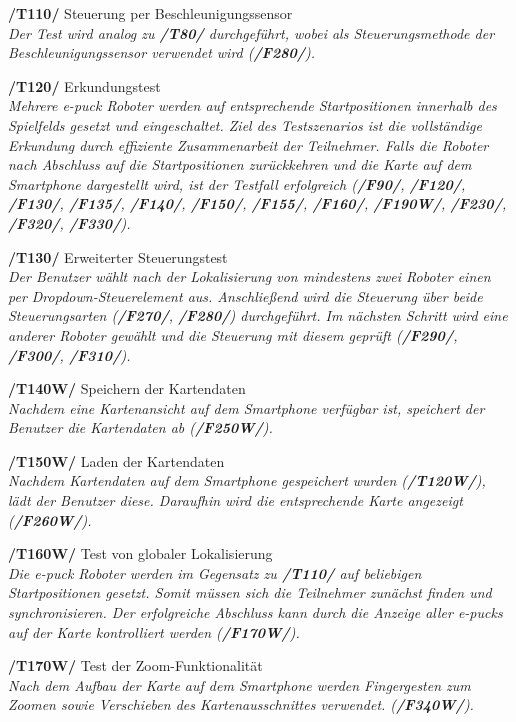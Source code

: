 \documentclass[10pt,a4paper]{article}
\begin{document}
\begin{list}{}{\leftmargin=1cm}
				\item[\textbf{/T110/}] Steuerung per Beschleunigungssensor
					\\ \textsl{Der Test wird analog zu \textbf{/T80/} durchgeführt, wobei als Steuerungsmethode der Beschleunigungssensor
						verwendet wird (\textbf{/F280/}).}
				\item[\textbf{/T120/}] Erkundungstest
					\\ \textsl{Mehrere e-puck Roboter werden auf entsprechende Startpositionen innerhalb des Spielfelds gesetzt und
						eingeschaltet. Ziel des Testszenarios ist die vollständige Erkundung durch effiziente Zusammenarbeit der Teilnehmer.
						Falls die Roboter nach Abschluss auf die Startpositionen zurückkehren und die Karte auf dem Smartphone dargestellt
						wird, ist der Testfall erfolgreich (\textbf{/F90/}, \textbf{/F120/}, \textbf{/F130/}, \textbf{/F135/}, \textbf{/F140/},
						\textbf{/F150/}, \textbf{/F155/}, \textbf{/F160/}, \textbf{/F190W/}, \textbf{/F230/}, \textbf{/F320/}, \textbf{/F330/}).}
				\item[\textbf{/T130/}] Erweiterter Steuerungstest
					\\ \textsl{Der Benutzer wählt nach der Lokalisierung von mindestens zwei Roboter einen per Dropdown-Steuerelement aus.
						Anschließend wird die Steuerung über beide Steuerungsarten (\textbf{/F270/}, \textbf{/F280/}) durchgeführt. Im nächsten
						Schritt wird eine anderer Roboter gewählt und die Steuerung mit diesem geprüft (\textbf{/F290/}, \textbf{/F300/},
						\textbf{/F310/}).}
				\item[\textbf{/T140W/}] Speichern der Kartendaten
					\\ \textsl{Nachdem eine Kartenansicht auf dem Smartphone verfügbar ist, speichert der Benutzer die Kartendaten ab
						(\textbf{/F250W/}).}
				\item[\textbf{/T150W/}] Laden der Kartendaten
					\\ \textsl{Nachdem Kartendaten auf dem Smartphone gespeichert wurden (\textbf{/T120W/}), lädt der Benutzer diese.
						Daraufhin wird die entsprechende Karte angezeigt (\textbf{/F260W/}).}						
				\item[\textbf{/T160W/}] Test von globaler Lokalisierung
					\\ \textsl{Die e-puck Roboter werden im Gegensatz zu \textbf{/T110/} auf beliebigen Startpositionen gesetzt. Somit müssen
						sich die Teilnehmer zunächst finden und synchronisieren. Der erfolgreiche Abschluss kann durch die Anzeige aller e-pucks
						auf der Karte kontrolliert werden (\textbf{/F170W/}).}		
				\item[\textbf{/T170W/}] Test der Zoom-Funktionalität
					\\ \textsl{Nach dem Aufbau der Karte auf dem Smartphone werden Fingergesten zum Zoomen sowie Verschieben des
						Kartenausschnittes verwendet. (\textbf{/F340W/}).}																						
			\end{list} 
			
	\newpage	
	\printglossary[style=altlist,title=Glossar]
						
\end{document}
